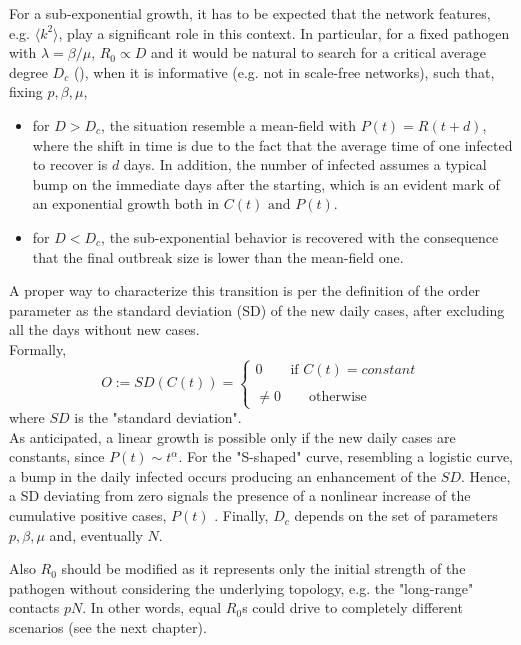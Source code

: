 \documentclass[a4paper,12pt,twoside]{book} %
\theoremstyle{definition}
\begin{document}
For a sub-exponential growth, it has to be expected that the network features, e.g. $\langle k^2 \rangle$, play a significant role in this context. In particular, for a fixed pathogen with $\lambda = \beta/ \mu$, $R_0 \propto D$ and it would be natural to search for a critical average degree $D_c$ (\cite{Thurner::NetBasedExpl}), when it is informative (e.g. not in scale-free networks), such that, fixing $p, \beta, \mu$, 
\begin{itemize}
	\item for $D>D_c$, the situation resemble a mean-field with $P(t) = R(t+d)$, where the shift in time is due to the fact that the average time of one infected to recover is $d$ days. In addition, the number of infected assumes a typical bump on the immediate days after the starting, which is an evident mark of an exponential growth both in $C(t) \text{ and } P(t)$.
	\item for $D<D_c$, the sub-exponential behavior is recovered with the consequence that the final outbreak size is lower than the mean-field one.
\end{itemize}
A proper way to characterize this transition is per the definition of the order parameter \cite{Thurner::NetBasedExpl} as the standard deviation (SD) of the new daily cases, after excluding all the days without new cases.
\\Formally,
\begin{equation}
	O := SD(C(t)) = 
	\begin{cases}
		0 \qquad \text{if $C(t) = constant$}\\\\
		\neq 0 \qquad \text{otherwise} 
	\end{cases}
\end{equation}
where $SD$ is the "standard deviation".
\\As anticipated, a linear growth is possible only if the new daily cases are constants, since $P(t) \sim t^{\alpha}$. For the "S-shaped" curve, resembling a logistic curve, a bump in the daily infected occurs producing an enhancement of the $SD$. Hence, a SD deviating from zero signals the presence of a nonlinear increase of the cumulative positive cases, $P(t)$ \cite{Thurner::NetBasedExpl}. Finally, $D_c$ depends on the set of parameters $p, \beta, \mu$ \cite{Thurner::NetBasedExpl} and, eventually $N$.

Also $R_0$ should be modified as it represents only the initial strength of the pathogen without considering the underlying topology, e.g. the "long-range" contacts $pN$. In other words, equal $R_0$s could drive to completely different scenarios (see the next chapter).
\end{document}
